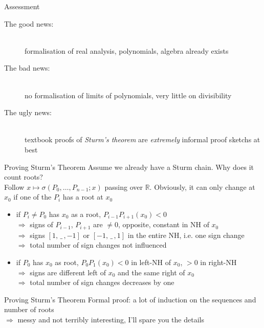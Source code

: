 \documentclass[%
	sans,			%
	mathsans,		%
	10pt,
	t		%
	slidescentered,%
]{beamer}
\newcommand{\RR}{\mathbb{R}}
\begin{document}
\begin{frame}{Assessment}
\begin{description}
\item[The good news:]\ \\formalisation of real analysis, polynomials, algebra already exists
\pause\item[The bad news:]\ \\no formalisation of limits of polynomials, very little on divisibility
\pause\item[The ugly news:]\ \\textbook proofs of \emph{Sturm's theorem} are \emph{extremely} informal proof sketchs at best
\end{description}
\end{frame}

\begin{frame}{Proving Sturm's Theorem}
Assume we already have a Sturm chain. Why does it count roots?\\
Follow $x \mapsto \sigma(P_0, \ldots, P_{n-1}; x)$ passing over $\RR$. Obviously, it can only change at $x_0$ if one of the $P_i$ has a root at $x_0$\pause
\begin{itemize}
\item if $P_i \neq P_0$ has $x_0$ as a root, $P_{i-1}P_{i+1}(x_0) < 0$\\\pause
$\Rightarrow$ signs of $P_{i-1}$, $P_{i+1}$ are $\neq 0$, opposite, constant in NH of $x_0$\\\pause
$\Rightarrow$ signs $[1,\, \_\,, -1]$ or $[-1,\, \_\,, 1]$ in the entire NH, i.e. one sign change\\\pause
$\Rightarrow$ total number of sign changes not influenced\\[1mm]\pause
\item if $P_0$ has $x_0$ as root, $P_0P_1(x_0) < 0$ in left-NH of $x_0$, $>0$ in right-NH\\\pause
$\Rightarrow$ signs are different left of $x_0$ and the same right of $x_0$\\\pause
$\Rightarrow$ total number of sign changes decreases by one
\end{itemize}
\end{frame}

\begin{frame}{Proving Sturm's Theorem}
Formal proof: a lot of induction on the sequences and number of roots\\[2mm]
$\Longrightarrow$ messy and not terribly interesting, I'll spare you the details
\end{frame}
\end{document}
